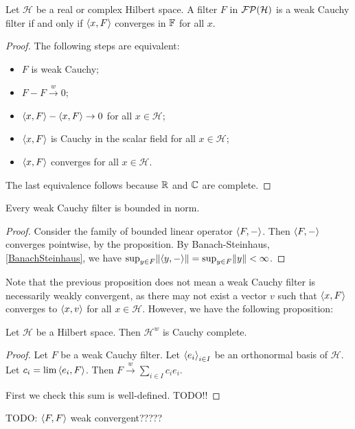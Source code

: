 \begin{proposition}
Let $\mathcal{H}$ be a real or complex Hilbert space.
A filter $F$ in $\operatorname{\mathcal{FP}}(\mathcal{H})$ is a weak Cauchy filter \textup{if and only if} $\left\langle x,F \right\rangle$ converges in $\mathbb{F}$ for all $x$.
\end{proposition}
\begin{proof}
The following steps are equivalent:
\begin{itemize}
\item $F$ is weak Cauchy;
\item $F-F \overset{w}{\longrightarrow} 0$;
\item $\left\langle x, F \right\rangle - \left\langle x,F \right\rangle \to 0$ for all $x\in \mathcal{H}$;
\item $\left\langle x, F \right\rangle$ is Cauchy in the scalar field for all $x\in\mathcal{H}$;
\item $\left\langle x, F \right\rangle$ converges for all $x\in\mathcal{H}$.
\end{itemize}
The last equivalence follows because $\mathbb{R}$ and $\mathbb{C}$ are complete.
\end{proof}
\begin{corollary}
Every weak Cauchy filter is bounded in norm.
\end{corollary}
\begin{proof}
Consider the family of bounded linear operator $\left\langle F,- \right\rangle$. Then $\left\langle F,- \right\rangle$ converges pointwise, by the proposition. By Banach-Steinhaus, \ref{BanachSteinhaus}, we have $\sup_{y\in F}\lVert\left\langle y,- \right\rangle\rVert = \sup_{y\in F}\lVert y\rVert <\infty$.
\end{proof}

Note that the previous proposition does not mean a weak Cauchy filter is necessarily weakly convergent, as there may not exist a vector $v$ such that $\left\langle x,F \right\rangle$ converges to $\left\langle x,v \right\rangle$ for all $x\in\mathcal{H}$. However, we have the following proposition:

\begin{proposition}
Let $\mathcal{H}$ be a Hilbert space. Then $\mathcal{H}^w$ is Cauchy complete.
\end{proposition}
\begin{proof}
Let $F$ be a weak Cauchy filter. Let $\left\langle e_i \right\rangle_{i\in I}$ be an orthonormal basis of $\mathcal{H}$. Let $c_i = \lim \left\langle e_i, F \right\rangle$. Then $F \overset{w}{\longrightarrow} \sum_{i\in I}c_i e_i$.

First we check this sum is well-defined. TODO!!
\end{proof}

TODO: $\left\langle F,F \right\rangle$ weak convergent?????


